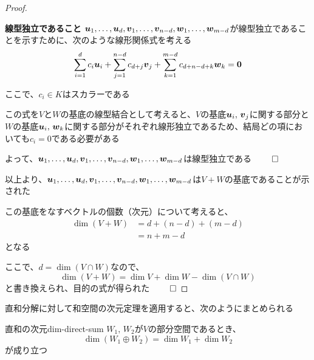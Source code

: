 \documentclass[../../../topic_linear-algebra]{subfiles}
\begin{document}
\begin{proof}
  \begin{subpattern}{\bfseries 線型独立であること}
    $\vb*{u}_1, \dots, \vb*{u}_d, \vb*{v}_1, \dots, \vb*{v}_{n-d}, \vb*{w}_1, \dots, \vb*{w}_{m-d}$が線型独立であることを示すために、次のような線形関係式を考える
    \begin{equation*}
      \sum_{i=1}^d c_i \vb*{u}_i + \sum_{j=1}^{n-d} c_{d+j} \vb*{v}_j + \sum_{k=1}^{m-d} c_{d+n-d+k} \vb*{w}_k = \vb*{0}
    \end{equation*}

    ここで、$c_i \in K$はスカラーである

    \br

    この式を$V$と$W$の基底の線型結合として考えると、$V$の基底$\vb*{u}_i, \, \vb*{v}_j$に関する部分と$W$の基底$\vb*{u}_i, \, \vb*{w}_k$に関する部分がそれぞれ線形独立であるため、結局どの項においても$c_i = 0$である必要がある

    \br

    よって、$\vb*{u}_1, \dots, \vb*{u}_d, \vb*{v}_1, \dots, \vb*{v}_{n-d}, \vb*{w}_1, \dots, \vb*{w}_{m-d}$は線型独立である $\qed$
  \end{subpattern}

  \br

  以上より、$\vb*{u}_1, \dots, \vb*{u}_d, \vb*{v}_1, \dots, \vb*{v}_{n-d}, \vb*{w}_1, \dots, \vb*{w}_{m-d}$は$V + W$の基底であることが示された

  \br

  この基底をなすベクトルの個数（次元）について考えると、
  \begin{align*}
    \dim(V + W) & = d + (n - d) + (m - d) \\
                & = n + m - d
  \end{align*}
  となる

  ここで、$d = \dim(V \cap W)$なので、
  \begin{equation*}
    \dim(V + W) = \dim V + \dim W - \dim(V \cap W)
  \end{equation*}
  と書き換えられ、目的の式が得られた $\qed$
\end{proof}

\sectionline

直和分解に対して和空間の次元定理を適用すると、次のようにまとめられる

\begin{theorem}{直和の次元}{dim-direct-sum}
  $W_1,\,W_2$が$V$の部分空間であるとき、
  \begin{equation*}
    \dim(W_1 \oplus W_2) = \dim W_1 + \dim W_2
  \end{equation*}
  が成り立つ
\end{theorem}
\end{document}
